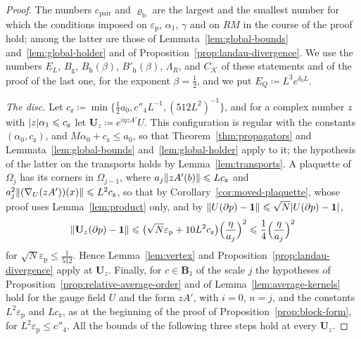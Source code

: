 \documentclass[11pt]{preprint}
\newcommand{\id}{\mathbf 1}
\DeclarePairedDelimiter{\abs}{\lvert}{\rvert}
\DeclarePairedDelimiter{\norm}{\lVert}{\rVert}
\numberwithin{equation}{section}
\begin{document}
\begin{proof}
The numbers $c_{\mathrm{pair}}$ and $\varrho_{\mathrm b}$ are the largest and the smallest number for which the conditions imposed on $\varepsilon_{\mathrm p}$, $\alpha_1$, $\gamma$ and on $RM$ in the course of the proof hold; among the latter are those of Lemmata~\ref{lem:global-bounds} and~\ref{lem:global-holder} and of Proposition~\ref{prop:landau-divergence}. We use the numbers $E_L$, $B_{\mathrm g}$, $B_{\mathrm h}(\beta)$, $B'_{\mathrm h}(\beta)$, $\Lambda_R$, and $C_{\mathcal K}$ of these statements and of the proof of the last one, for the exponent $\beta = \frac{1}{2}$, and we put $E_Q \coloneqq L^3e^{\delta_0L}$.

\emph{The disc.} Let $c_{\mathrm z} \coloneqq \min\{ \frac{1}{2}a_0, c''_4L^{-1}, (512L^2)^{-1} \}$, and for a complex number $z$ with $\abs z\alpha_1 \leqslant c_{\mathrm z}$ let $\mathbf U_z \coloneqq e^{i\eta zA'}U$. This configuration is regular with the constants $(\alpha_0, c_{\mathrm z})$, and $M\alpha_0 + c_{\mathrm z} \leqslant a_0$, so that Theorem~\ref{thm:propagators} and Lemmata~\ref{lem:global-bounds} and~\ref{lem:global-holder} apply to it; the hypothesis of the latter on the transports holds by Lemma~\ref{lem:transports}. A plaquette of $\Omega_j$ has its corners in $\Omega_{j-1}$, where $a_j\norm{zA'(b)} \leqslant Lc_{\mathrm z}$ and $a_j^2\norm{(\nabla_U(zA'))(x)} \leqslant L^2c_{\mathrm z}$, so that by Corollary~\ref{cor:moved-plaquette}, whose proof uses Lemma~\ref{lem:product} only, and by $\norm{U(\partial p) - \id} \leqslant \sqrt N\abs{U(\partial p) - \id}$,
\[
    \norm{\mathbf U_z(\partial p) - \id} \leqslant \bigl(\sqrt N\varepsilon_{\mathrm p} + 10L^2c_{\mathrm z}\bigr)\Bigl(\frac{\eta}{a_j}\Bigr)^2 \leqslant \frac{1}{4}\Bigl(\frac{\eta}{a_j}\Bigr)^2
\]
for $\sqrt N\varepsilon_{\mathrm p} \leqslant \frac{1}{512}$. Hence Lemma~\ref{lem:vertex} and Proposition~\ref{prop:landau-divergence} apply at $\mathbf U_z$. Finally, for $c \in \mathbf B_1$ of the scale $j$ the hypotheses of Proposition~\ref{prop:relative-average-order} and of Lemma~\ref{lem:average-kernels} hold for the gauge field $U$ and the form $zA'$, with $i = 0$, $n = j$, and the constants $L^2\varepsilon_{\mathrm p}$ and $Lc_{\mathrm z}$, as at the beginning of the proof of Proposition~\ref{prop:block-form}, for $L^2\varepsilon_{\mathrm p} \leqslant c''_4$. All the bounds of the following three steps hold at every $\mathbf U_z$.


\end{proof}
\end{document}
